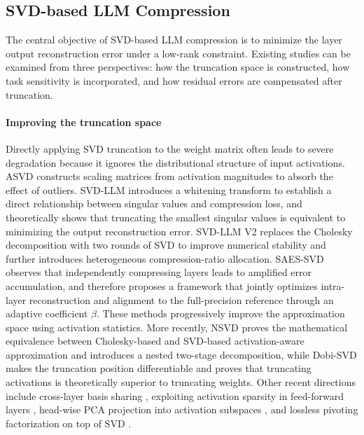 \subsection{SVD-based LLM Compression}

The central objective of SVD-based LLM compression is to minimize the layer output reconstruction error under a low-rank constraint. Existing studies can be examined from three perspectives: how the truncation space is constructed, how task sensitivity is incorporated, and how residual errors are compensated after truncation.

\paragraph{Improving the truncation space}
Directly applying SVD truncation to the weight matrix often leads to severe degradation because it ignores the distributional structure of input activations. ASVD \citep{yuan2023asvd} constructs scaling matrices from activation magnitudes to absorb the effect of outliers. SVD-LLM \citep{wang2025svdllm} introduces a whitening transform to establish a direct relationship between singular values and compression loss, and theoretically shows that truncating the smallest singular values is equivalent to minimizing the output reconstruction error. SVD-LLM V2 \citep{wang2025svdllmv2} replaces the Cholesky decomposition with two rounds of SVD to improve numerical stability and further introduces heterogeneous compression-ratio allocation. SAES-SVD \citep{hu2026saessvd} observes that independently compressing layers leads to amplified error accumulation, and therefore proposes a framework that jointly optimizes intra-layer reconstruction and alignment to the full-precision reference through an adaptive coefficient $\beta$. These methods progressively improve the approximation space using activation statistics. More recently, NSVD \citep{lu2025nsvd} proves the mathematical equivalence between Cholesky-based and SVD-based activation-aware approximation and introduces a nested two-stage decomposition, while Dobi-SVD \citep{wang2025dobisvd} makes the truncation position differentiable and proves that truncating activations is theoretically superior to truncating weights. Other recent directions include cross-layer basis sharing \citep{wang2024basissharing}, exploiting activation sparsity in feed-forward layers \citep{huang2025sola}, head-wise PCA projection into activation subspaces \citep{tian2025flatllm}, and lossless pivoting factorization on top of SVD \citep{zhao2025pifa}.

